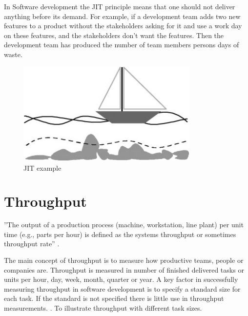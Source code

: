 \documentclass[UKenglish]{ifimaster}  %
\begin{document}
In Software development the JIT principle means that one should not deliver anything before its demand. For example, if a development team adds two new features to a product without the stakeholders asking for it and use a work day on these features, and the stakeholders don't want the features. Then the development team has produced the number of team members persons days of waste. 

\begin{figure}[ht!]
\centering
\includegraphics[width=90mm]{Picture/JIT.jpg}
\caption{JIT example}
\label{JITE} %
\end{figure}

\section{Throughput}
''The output of a production process (machine, workstation, line plant) per unit time (e.g., parts per hour) is defined as the systems throughput or sometimes throughput rate'' \parencite{Adams}.

The main concept of throughput is to measure how productive teams, people or companies are. Throughput is measured in number of finished delivered tasks or units per hour, day, week, month, quarter or year. A key factor in successfully measuring throughput in software development is to specify a standard size for each task. If the standard is not specified there is little use in throughput measurements.  \parencite{Throughput}. To illustrate throughput with different task sizes. 
\end{document}
